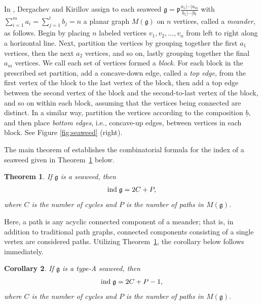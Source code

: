 \documentclass[letterpaper,10pt]{article}
\newtheorem{theorem}{Theorem}
\newtheorem{corollary}[theorem]{Corollary}
\newcommand{\ind}{{\rm ind \hspace{.1cm}}}
\begin{document}
In \textbf{\cite{DK}}, Dergachev and Kirillov assign to each seaweed $\mathfrak{g}=\mathfrak{p}\frac{ a_1|\cdots|a_m}{b_1|\cdots|b_t}$ with $\sum_{i=1}^ma_i=\sum_{j=1}^tb_j=n$ a planar graph $M(\mathfrak{g})$ on $n$ vertices, called a \textit{meander}, as follows. Begin by placing $n$ labeled vertices $v_1, v_2, \dots , v_n$ from left to right along a horizontal line. Next, partition the vertices by grouping together the first $a_1$ vertices, then the next $a_2$ vertices, and so on, lastly grouping together the final $a_m$ vertices. We call each set of vertices formed a \textit{block}. For each block in the prescribed set partition, add a concave-down edge, called a \textit{top edge}, from the first vertex of the block to the last vertex of the block, then add a top edge between the second vertex of the block and the second-to-last vertex of the block, and so on within each block, assuming that the vertices being connected are distinct. In a similar way, partition the vertices according to the composition $\underline{b},$ and then place \textit{bottom edges}, i.e., concave-up edges, between vertices in each block. See Figure \ref{fig:seaweed} (right).


The main theorem of \textup{\textbf{\cite{DK}}} establishes the combinatorial formula for the index of a seaweed given in Theorem~\ref{rem:indexform} below.

\begin{theorem}\label{rem:indexform} If $\mathfrak{g}$ is a seaweed, then $$\ind \mathfrak{g} =2C + P,$$ where $C$ is the number of cycles and $P$ is the number of paths in $M(\mathfrak{g})$.
\end{theorem}

\noindent Here, a path is any acyclic connected component of a meander; that is, in addition to traditional path graphs, connected components consisting of a single vertex are considered paths. Utilizing Theorem~\ref{rem:indexform}, the corollary below follows immediately.

\begin{corollary}\label{cor:indA}
If $\mathfrak{g}$ is a type-A seaweed, then $$\ind\mathfrak{g}=2C+P-1,$$ where $C$ is the number of cycles and $P$ is the number of paths in $M(\mathfrak{g}).$
\end{corollary}
\end{document}
